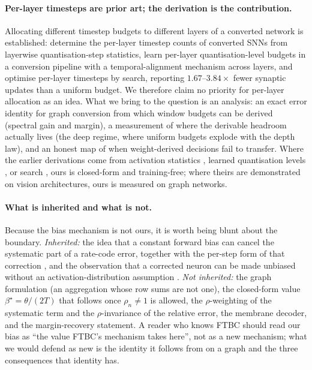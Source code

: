 \documentclass[10pt,twocolumn]{article}
\newcommand{\betastar}{\beta^{\star}}
\newcommand{\rhon}{\rho_{n}}
\begin{document}
\paragraph{Per-layer timesteps are prior art; the derivation is the contribution.} Allocating
different timestep budgets to different layers of a converted network is established:
\citet{ramesh2025pascal} determine the per-layer timestep counts of converted SNNs from layerwise
quantisation-step statistics, \citet{guo2026mixed} learn per-layer quantisation-level budgets in a
conversion pipeline with a temporal-alignment mechanism across layers, and
\citet{nallathambi2022ldsnn} optimise per-layer timesteps by search, reporting $1.67$--$3.84\times$
fewer synaptic updates than a uniform budget. We therefore claim no priority for per-layer
allocation as an idea. What we bring to the question is an analysis: an exact error identity for
graph conversion from which window budgets can be derived (spectral gain and margin), a
measurement of where the derivable headroom actually lives (the deep regime, where uniform budgets
explode with the depth law), and an honest map of when weight-derived decisions fail to transfer.
Where the earlier derivations come from activation statistics
\citep{ramesh2025pascal}, learned quantisation levels \citep{guo2026mixed}, or search
\citep{nallathambi2022ldsnn}, ours is closed-form and training-free; where theirs are demonstrated
on vision architectures, ours is measured on graph networks.

\paragraph{What is inherited and what is not.}
Because the bias mechanism is not ours, it is worth being blunt about the boundary. \emph{Inherited:}
the idea that a constant forward bias can cancel the systematic part of a rate-code error, together
with the per-step form of that correction \citep{wu2024ftbc}, and the observation that a corrected
neuron can be made unbiased without an activation-distribution assumption \citep{bojkovic2025temporal}.
\emph{Not inherited:} the graph formulation (an aggregation whose row sums are not one), the
closed-form value $\betastar = \theta/(2T)$ that follows once $\rhon \neq 1$ is allowed, the
$\rho$-weighting of the systematic term and the $\rho$-invariance of the relative error, the membrane
decoder, and the margin-recovery statement. A reader who knows FTBC should read our bias as ``the
value FTBC's mechanism takes here'', not as a new mechanism; what we would defend as new is the
identity it follows from on a graph and the three consequences that identity has.
\end{document}
